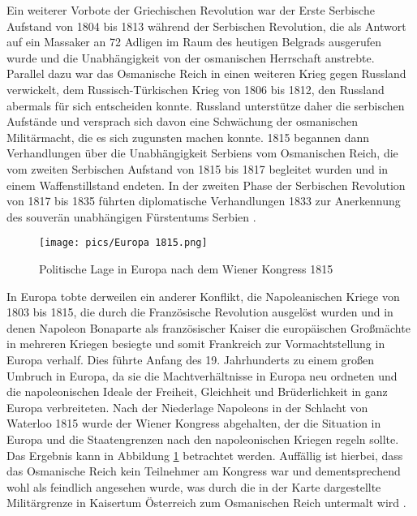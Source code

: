 \documentclass[preprint]{geomorphica} %
\begin{document}
Ein weiterer Vorbote der Griechischen Revolution war der Erste Serbische Aufstand von 1804 bis 1813 während der Serbischen Revolution, die als Antwort auf ein Massaker an 72 Adligen im Raum des heutigen Belgrads ausgerufen wurde und die Unabhängigkeit von der osmanischen Herrschaft anstrebte.
Parallel dazu war das Osmanische Reich in einen weiteren Krieg gegen Russland verwickelt, dem Russisch-Türkischen Krieg von 1806 bis 1812, den Russland abermals für sich entscheiden konnte.
Russland unterstütze daher die serbischen Aufstände und versprach sich davon eine Schwächung der osmanischen Militärmacht, die es sich zugunsten machen konnte.
1815 begannen dann Verhandlungen über die Unabhängigkeit Serbiens vom Osmanischen Reich, die vom zweiten Serbischen Aufstand von 1815 bis 1817 begleitet wurden und in einem Waffenstillstand endeten.
In der zweiten Phase der Serbischen Revolution von 1817 bis 1835 führten diplomatische Verhandlungen 1833 zur Anerkennung des souverän unabhängigen Fürstentums Serbien \cite{Jorga1990, Anderson1966, Ranke1829, Ilicak2022}.

\begin{figure}[h]
    \centering
    \texttt{[image: pics/Europa 1815.png]}
    \caption{Politische Lage in Europa nach dem Wiener Kongress 1815 \cite{Altenhof2016}}
    \label{pic:europe1815}
\end{figure}

In Europa tobte derweilen ein anderer Konflikt, die Napoleanischen Kriege von 1803 bis 1815, die durch die Französische Revolution ausgelöst wurden und in denen Napoleon Bonaparte als französischer Kaiser die europäischen Großmächte in mehreren Kriegen besiegte und somit Frankreich zur Vormachtstellung in Europa verhalf.
Dies führte Anfang des 19. Jahrhunderts zu einem großen Umbruch in Europa, da sie die Machtverhältnisse in Europa neu ordneten und die napoleonischen Ideale der Freiheit, Gleichheit und Brüderlichkeit in ganz Europa verbreiteten.
Nach der Niederlage Napoleons in der Schlacht von Waterloo 1815 wurde der Wiener Kongress abgehalten, der die Situation in Europa und die Staatengrenzen nach den napoleonischen Kriegen regeln sollte. 
Das Ergebnis kann in Abbildung \ref{pic:europe1815} betrachtet werden.
Auffällig ist hierbei, dass das Osmanische Reich kein Teilnehmer am Kongress war und dementsprechend wohl als feindlich angesehen wurde, was durch die in der Karte dargestellte Militärgrenze in Kaisertum Österreich zum Osmanischen Reich untermalt wird \cite{Anderson1966, Jourdan2022, Ilicak2022}.
\end{document}
